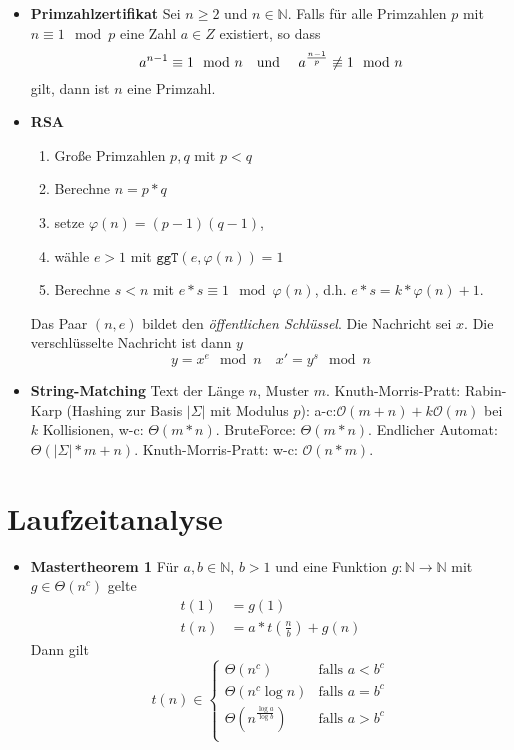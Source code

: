 \documentclass[landscape, 8pt, a4paper]{extarticle}
\newcommand{\ggT}{\texttt{ggT}}
\newcommand{\N}{\mathbb{N}}
\renewcommand{\O}{\mathcal O}
\begin{document}
\begin{multicols}{3}
\begin{itemize}
		\item \textbf{Primzahlzertifikat} Sei $n\geq 2$ und $n\in\N$. Falls für alle Primzahlen $p$ mit $n\equiv 1\mod p$ eine Zahl $a\in Z$ existiert, so dass
		\begin{equation*}
		 	a^{n-1}\equiv 1\mod n \text{\quad und \quad}a^{\frac{n-1}p}\not\equiv 1\mod n
		\end{equation*}
		gilt, dann ist $n$ eine Primzahl. 

		\item \textbf{RSA}
		\begin{enumerate}
			\item Große Primzahlen $p,q$ mit $p<q$
			\item Berechne $n=p*q$
			\item setze $\varphi(n)=(p-1)(q-1)$,
			\item wähle $e>1$ mit $\ggT(e,\varphi(n))=1$
			\item Berechne $s<n$ mit $e*s\equiv 1\mod \varphi(n)$, d.h. $e*s=k*\varphi(n)+1$. 
		\end{enumerate}
		Das Paar $(n,e)$ bildet den \emph{öffentlichen Schlüssel}. Die Nachricht sei $x$. Die verschlüsselte Nachricht ist dann $y$
		\begin{equation*}
			y=x^e\mod n\quad x'=y^s\mod n
		\end{equation*}

		\item \textbf{String-Matching} Text der Länge $n$, Muster $m$. Knuth-Morris-Pratt:
		Rabin-Karp (Hashing zur Basis $|\Sigma|$ mit Modulus $p$): a-c:$\O(m+n)+k\O(m)$ bei $k$ Kollisionen, w-c: $\Theta(m*n)$.
		BruteForce: $\Theta(m*n)$. Endlicher Automat: $\Theta(|\Sigma|*m+n)$. Knuth-Morris-Pratt: w-c: $\O(n*m)$.
	\end{itemize}


	\section{Laufzeitanalyse}
	\begin{itemize}
		\item \textbf{Mastertheorem 1} Für $a,b\in\N$, $b>1$ und eine Funktion $g:\N\rightarrow \N$ mit $g\in\Theta(n^c)$ gelte
		\begin{align*}
			t(1)&=g(1)\\
			t(n)&=a*t\left(\frac nb\right)+g(n)
		\end{align*}
		Dann gilt 
		\begin{equation*}
			t(n)\in\begin{cases}
			\Theta(n^c)&\text{falls }a<b^c\\
			\Theta(n^c\log n)&\text{falls }a=b^c\\
			\Theta(n^{\frac{\log a}{\log b}})&\text{falls }a>b^c\\
			\end{cases}
		\end{equation*}


\end{itemize}
\end{multicols}
\end{document}
